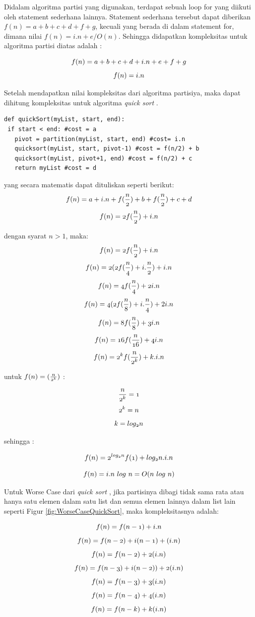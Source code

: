 \documentclass[12pt]{book}%
\begin{document}
Didalam algoritma partisi yang digunakan, terdapat sebuah loop for yang diikuti oleh statement sederhana lainnya. Statement sederhana tersebut dapat diberikan $f(n)= a+b+c+d+f+g$, kecuali yang berada di dalam statement for, dimana nilai $f(n) = i.n+e /O(n)$. Sehingga didapatkan kompleksitas untuk algoritma partisi diatas adalah :

$$ \mathnormal{f(n) = a+b+c+d+i.n+e+f+g} $$
$$ \mathnormal{f(n) = i.n} $$

Setelah mendapatkan nilai kompleksitas dari algoritma partisiya, maka dapat dihitung kompleksitas untuk algoritma \textit{quick sort} .

\lstset{language=Python}
\label{lst:QuickSort}
\begin{lstlisting}[frame=single]
def quickSort(myList, start, end):
 if start < end: #cost = a
   pivot = partition(myList, start, end) #cost= i.n
   quicksort(myList, start, pivot-1) #cost = f(n/2) + b
   quicksort(myList, pivot+1, end) #cost = f(n/2) + c
   return myList #cost = d
\end{lstlisting}

yang secara matematis dapat dituliskan seperti berikut:
$$	  \mathnormal{f(n) = a+i.n+f(\frac{n}{2})+b+f(\frac{n}{2})+c+d } $$
$$	  \mathnormal{f(n) = 2f(\frac{n}{2})+i.n } $$

dengan syarat $n > 1$, maka:
$$	  \mathnormal{f(n) = 2f(\frac{n}{2})+i.n } $$
$$	  \mathnormal{f(n) = 2(2f(\frac{n}{4})+i.\frac{n}{2} )} + i.n $$
$$	  \mathnormal{f(n) = 4f(\frac{n}{4})+2i.n } $$
$$	  \mathnormal{f(n) = 4(2f(\frac{n}{8})+i.\frac{n}{4} )}+2i.n $$
$$	  \mathnormal{f(n) = 8f(\frac{n}{8})+3i.n } $$
$$	  \mathnormal{f(n) = 16f(\frac{n}{16})+4i.n } $$
$$	  \mathnormal{f(n) = 2^{k}f(\frac{n}{2^{k}})+k.i.n } $$

untuk $ \mathnormal{f(n) = (\frac{n}{2^{k}})} $ :

$$ \mathnormal{\frac{n}{2^{k}}=1} $$
$$ \mathnormal{2^{k}=n} $$
$$ \mathnormal{k=log_{2}n} $$

sehingga :

$$	  \mathnormal{f(n) = 2^{log_{2}n}f(1)+log_{2}n.i.n } $$

$$	  \mathnormal{f(n) = i.n\ log\ n = O(n\ log\ n)} $$

Untuk Worse Case dari \textit{quick sort} , jika partisinya dibagi tidak sama rata atau hanya satu elemen dalam satu list dan semua elemen lainnya dalam list lain seperti Figur \ref{fig:WorseCaseQuickSort}, maka kompleksitasnya adalah:

$$	  \mathnormal{f(n) = f(n-1)+i.n} $$
$$	  \mathnormal{f(n) = f(n-2)+i(n-1)+(i.n)} $$
$$	  \mathnormal{f(n) = f(n-2)+2(i.n)} $$
$$	  \mathnormal{f(n) = f(n-3)+i(n-2))+2(i.n)} $$
$$	  \mathnormal{f(n) = f(n-3)+3(i.n)} $$
$$	  \mathnormal{f(n) = f(n-4)+4(i.n)} $$
$$	  \mathnormal{f(n) = f(n-k)+k(i.n)} $$
\end{document}
